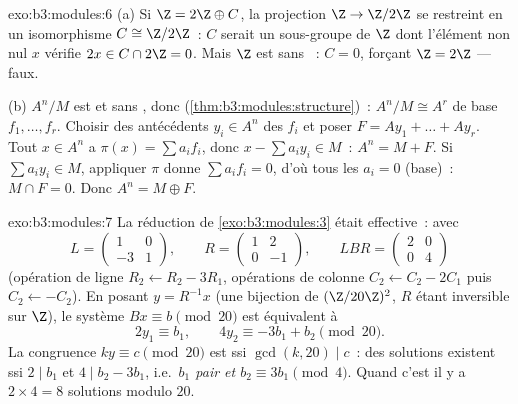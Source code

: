 \begin{solution}{exo:b3:modules:6}
(a) Si $\Z = 2\Z \oplus C$, la projection $\Z \to \Z/2\Z$ se
restreint en un isomorphisme $C \cong \Z/2\Z$~: $C$ serait un
sous-groupe de $\Z$ dont l'élément non nul $x$ vérifie $2x \in C
\cap 2\Z = 0$. Mais $\Z$ est sans ~: $C = 0$, forçant $\Z
= 2\Z$ --- faux.

(b) $A^n/M$ est  et sans , donc 
(\cref{thm:b3:modules:structure})~: $A^n/M \cong A^r$ de base
$f_1, \dots, f_r$. Choisir des antécédents $y_i \in A^n$ des
$f_i$ et poser $F = Ay_1 + \dots + Ay_r$. Tout $x \in A^n$ a
$\pi(x) = \sum a_if_i$, donc $x - \sum a_iy_i \in M$~: $A^n = M +
F$. Si $\sum a_iy_i \in M$, appliquer $\pi$ donne $\sum a_if_i =
0$, d'où tous les $a_i = 0$ (base)~: $M \cap F = 0$. Donc $A^n =
M \oplus F$.
\end{solution}

\begin{solution}{exo:b3:modules:7}
La réduction de \cref{exo:b3:modules:3} était effective~: avec
\[
L = \begin{pmatrix} 1 & 0\\ -3 & 1\end{pmatrix},
\qquad
R = \begin{pmatrix} 1 & 2\\ 0 & -1 \end{pmatrix},
\qquad
LBR = \begin{pmatrix} 2 & 0\\ 0 & 4\end{pmatrix}
\]
(opération de ligne $R_2 \leftarrow R_2 - 3R_1$, opérations de
colonne $C_2 \leftarrow C_2 - 2C_1$ puis $C_2 \leftarrow -C_2$).
En posant $y = R^{-1}x$ (une bijection de $(\Z/20\Z)^2$, $R$
étant inversible sur $\Z$), le système $Bx \equiv b \pmod{20}$
est équivalent à
\[
2y_1 \equiv b_1, \qquad 4y_2 \equiv -3b_1 + b_2 \pmod{20}.
\]
La congruence $ky \equiv c \pmod{20}$ est  ssi
$\gcd(k, 20) \mid c$~: des solutions existent ssi $2 \mid b_1$ et
$4 \mid b_2 - 3b_1$, i.e.\ \emph{$b_1$ pair et $b_2 \equiv 3b_1
\pmod 4$}. Quand c'est  il y a $2 \times 4 = 8$
solutions modulo $20$.
\end{solution}


